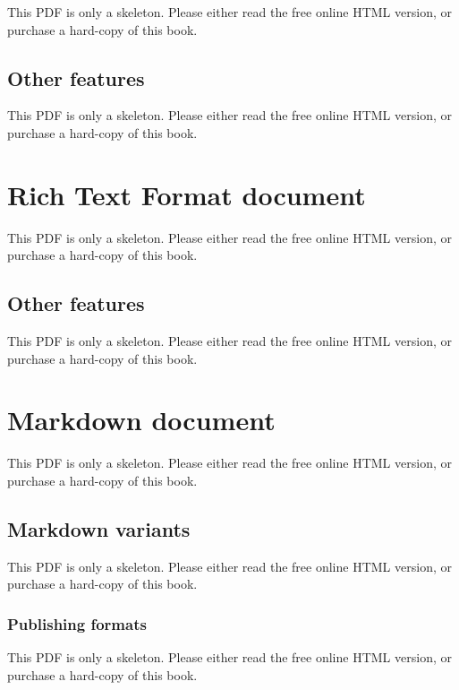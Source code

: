 \documentclass[
  11pt,
]{krantz}
\theoremstyle{definition}
\theoremstyle{definition}
\theoremstyle{definition}
\theoremstyle{definition}
\theoremstyle{remark}
\begin{document}
This PDF is only a skeleton. Please either read the free online HTML version, or purchase a hard-copy of this book.

\subsection{Other features}\label{other-features-2}

This PDF is only a skeleton. Please either read the free online HTML version, or purchase a hard-copy of this book.

\section{Rich Text Format document}\label{rich-text-format-document}

This PDF is only a skeleton. Please either read the free online HTML version, or purchase a hard-copy of this book.

\subsection{Other features}\label{other-features-3}

This PDF is only a skeleton. Please either read the free online HTML version, or purchase a hard-copy of this book.

\section{Markdown document}\label{markdown-document}

This PDF is only a skeleton. Please either read the free online HTML version, or purchase a hard-copy of this book.

\subsection{Markdown variants}\label{markdown-variants}

This PDF is only a skeleton. Please either read the free online HTML version, or purchase a hard-copy of this book.

\subsubsection{Publishing formats}\label{publishing-formats}

This PDF is only a skeleton. Please either read the free online HTML version, or purchase a hard-copy of this book.
\end{document}
